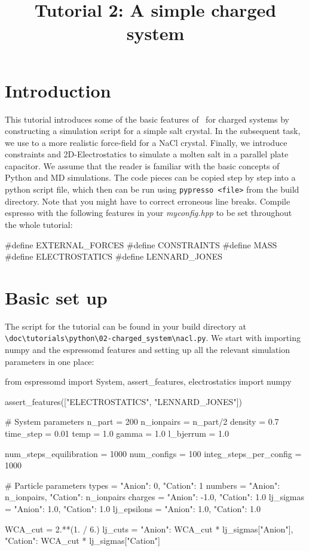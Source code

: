 \documentclass[
a4paper,                        %
11pt,                           %
twoside,                        %
footsepline,                    %
headsepline,                    %
headexclude,                    %
footexclude,                    %
pagesize,                       %
]{scrartcl}
\begin{document}
\esptitlehead
\title{Tutorial 2: A simple charged system%
}

\maketitle
\tableofcontents

\section{Introduction}

This tutorial introduces some of the basic features of \es\ for charged systems
by constructing a simulation script for a simple salt crystal. In the subsequent task,
we use to a more realistic force-field for a NaCl crystal. Finally, we introduce constraints
and 2D-Electrostatics to simulate a molten salt in a parallel plate capacitor.
We assume that the reader is familiar with the basic concepts of Python and MD simulations. The
code pieces can be copied step by step into a python script file, which then can
be run using \verb|pypresso <file>| from the \es build directory. Note that you might 
have to correct erroneous line breaks. Compile espresso with the following features 
in your \emph{myconfig.hpp} to be set throughout the whole tutorial:

\begin{pypresso}
#define EXTERNAL_FORCES
#define CONSTRAINTS
#define MASS
#define ELECTROSTATICS
#define LENNARD_JONES
\end{pypresso}

\section{Basic set up}

The script for the tutorial can be found in your build directory at\\
\verb|\doc\tutorials\python\02-charged_system\nacl.py|.
We start with importing numpy and the espressomd features and setting up all
the relevant simulation parameters in one place:

\begin{pypresso}

from espressomd import System, assert_features, electrostatics
import numpy

assert_features(["ELECTROSTATICS", "LENNARD_JONES"])


# System parameters
n_part = 200
n_ionpairs = n_part/2
density = 0.7
time_step = 0.01
temp = 1.0
gamma = 1.0
l_bjerrum = 1.0

num_steps_equilibration = 1000
num_configs = 100
integ_steps_per_config = 1000

# Particle parameters
types       = {"Anion":          0, "Cation": 1}
numbers     = {"Anion": n_ionpairs, "Cation": n_ionpairs}
charges     = {"Anion":       -1.0, "Cation": 1.0}
lj_sigmas   = {"Anion":        1.0, "Cation": 1.0}
lj_epsilons = {"Anion":        1.0, "Cation": 1.0}

WCA_cut = 2.**(1. / 6.)
lj_cuts     = {"Anion":  WCA_cut * lj_sigmas["Anion"], 
               "Cation": WCA_cut * lj_sigmas["Cation"]}
\end{pypresso}
\end{document}
